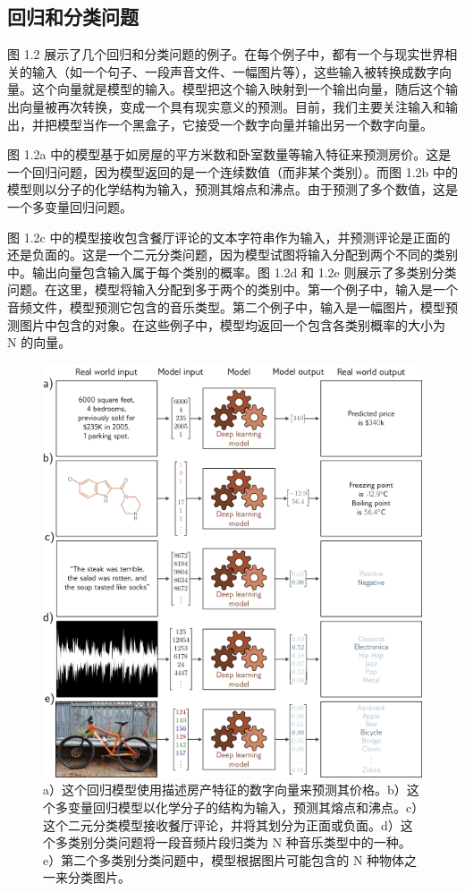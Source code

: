 \subsection{回归和分类问题}
图 1.2 展示了几个回归和分类问题的例子。在每个例子中，都有一个与现实世界相关的输入（如一个句子、一段声音文件、一幅图片等），这些输入被转换成数字向量。这个向量就是模型的输入。模型把这个输入映射到一个输出向量，随后这个输出向量被再次转换，变成一个具有现实意义的预测。目前，我们主要关注输入和输出，并把模型当作一个黑盒子，它接受一个数字向量并输出另一个数字向量。

图 1.2a 中的模型基于如房屋的平方米数和卧室数量等输入特征来预测房价。这是一个回归问题，因为模型返回的是一个连续数值（而非某个类别）。而图 1.2b 中的模型则以分子的化学结构为输入，预测其熔点和沸点。由于预测了多个数值，这是一个多变量回归问题。

图 1.2c 中的模型接收包含餐厅评论的文本字符串作为输入，并预测评论是正面的还是负面的。这是一个二元分类问题，因为模型试图将输入分配到两个不同的类别中。输出向量包含输入属于每个类别的概率。图 1.2d 和 1.2e 则展示了多类别分类问题。在这里，模型将输入分配到多于两个的类别中。第一个例子中，输入是一个音频文件，模型预测它包含的音乐类型。第二个例子中，输入是一幅图片，模型预测图片中包含的对象。在这些例子中，模型均返回一个包含各类别概率的大小为 N 的向量。

\begin{figure}
	\centering
	\includegraphics[width=0.7\linewidth]{png/chapter1/IntroModels}
	\caption{a）这个回归模型使用描述房产特征的数字向量来预测其价格。b）这个多变量回归模型以化学分子的结构为输入，预测其熔点和沸点。c）这个二元分类模型接收餐厅评论，并将其划分为正面或负面。d）这个多类别分类问题将一段音频片段归类为 N 种音乐类型中的一种。e）第二个多类别分类问题中，模型根据图片可能包含的 N 种物体之一来分类图片。}
\end{figure}

